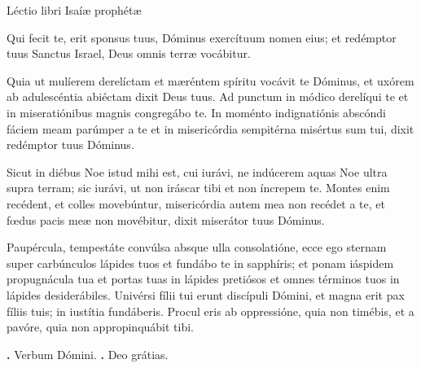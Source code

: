
Léctio libri Isaíæ prophétæ

Qui fecit te, erit sponsus tuus, Dóminus exercítuum nomen eius; et redémptor tuus Sanctus Israel, Deus omnis terræ vocábitur.

Quia ut mulíerem derelíctam et mæréntem spíritu vocávit te Dóminus, et uxórem ab adulescéntia abiéctam dixit Deus tuus.
Ad punctum in módico derelíqui te et in miseratiónibus magnis congregábo te.
In moménto indignatiónis abscóndi fáciem meam parúmper a te et in misericórdia sempitérna misértus sum tui, dixit redémptor tuus Dóminus.

Sicut in diébus Noe istud mihi est, cui iurávi, ne indúcerem aquas Noe ultra supra terram; sic iurávi, ut non iráscar tibi et non íncrepem te.
Montes enim recédent, et colles movebúntur, misericórdia autem mea non recédet a te, et fœdus pacis meæ non movébitur, dixit miserátor tuus Dóminus.

Paupércula, tempestáte convúlsa absque ulla consolatióne, ecce ego sternam super carbúnculos lápides tuos et fundábo te in sapphíris; et ponam iáspidem propugnácula tua et portas tuas in lápides pretiósos et omnes términos tuos in lápides desiderábiles. 
Univérsi fílii tui erunt discípuli Dómini, et magna erit pax fíliis tuis; in iustítia fundáberis.
Procul eris ab oppressióne, quia non timébis, et a pavóre, quia non appropinquábit tibi.

\textbf{\Vbar.} Verbum Dómini.
\textbf{\Rbar.} Deo grátias.
\par